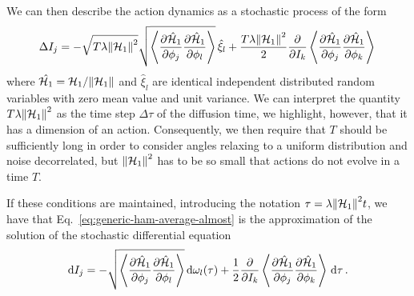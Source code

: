 We can then describe the action dynamics as a stochastic process of the form
\begin{equation}
	\Delta I_j = -\sqrt{T\lambda\norm{\mathcal{H}_1}^2}\sqrt{\left\langle\pdv{\hat{\mathcal{H}}_1}{\phi_j}\pdv{\hat{\mathcal{H}}_1}{\phi_l}\right\rangle}\,\hat{\xi}_l + \frac{T\lambda\norm{\mathcal{H}_1}^2}{2}\pdv{}{I_k}\left\langle\pdv{\hat{\mathcal{H}}_1}{\phi_j}\pdv{\hat{\mathcal{H}}_1}{\phi_k}\right\rangle\,
	\label{eq:generic-ham-average-almost}
\end{equation}
where \(\hat{\mathcal{H}_1}=\mathcal{H}_1/\norm{\mathcal{H}_1}\) and \(\hat{\xi}_l\) are identical independent distributed random variables with zero mean value and unit variance. We can interpret the quantity \(T\lambda\norm{\mathcal{H}_1}^2\) as the time step \(\Delta\tau\) of the diffusion time, we highlight, however, that it has a dimension of an action. Consequently, we then require that \(T\) should be sufficiently long in order to consider angles relaxing to a uniform distribution and noise decorrelated, but \(\norm{\mathcal{H}_1}^2\) has to be so small that actions do not evolve in a time \(T\). 

If these conditions are maintained, introducing the notation \(\tau = \lambda\norm{\mathcal{H}_1}^2 t\), we have that Eq.~\eqref{eq:generic-ham-average-almost} is the approximation of the solution of the stochastic differential equation
\begin{equation}
	\mathrm{d}I_j = -\sqrt{\left\langle\pdv{\hat{\mathcal{H}}_1}{\phi_j}\pdv{\hat{\mathcal{H}}_1}{\phi_l}\right\rangle}\,\mathrm{d}\omega_l(\tau) + \frac{1}{2}\pdv{}{I_k}\left\langle\pdv{\hat{\mathcal{H}}_1}{\phi_j}\pdv{\hat{\mathcal{H}}_1}{\phi_k}\right\rangle\,\mathrm{d}\tau\,.
	\label{eq:final-ham-approximation}
\end{equation}

